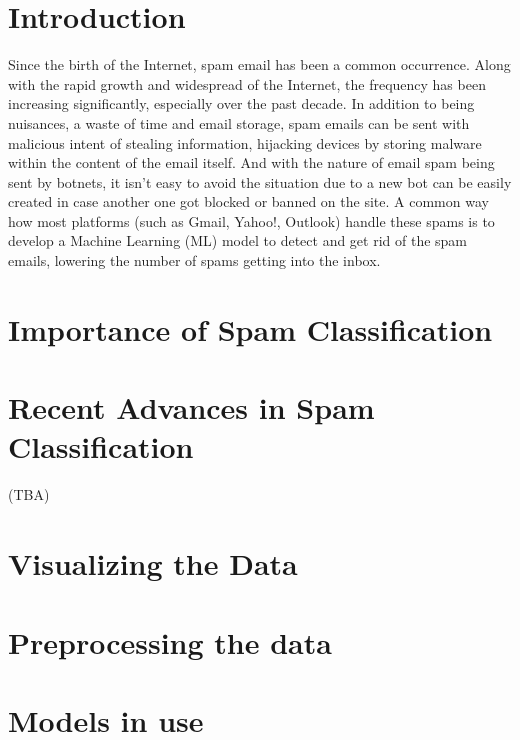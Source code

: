 \documentclass[conference]{IEEEtran}
\begin{document}
    \section{Introduction}
    \label{sec:introduction}
    Since the birth of the Internet, spam email has been a common occurrence.
    Along with the rapid growth and widespread of the Internet, the frequency has been increasing significantly, especially over the past decade.
    In addition to being nuisances, a waste of time and email storage, spam emails can be sent with malicious intent of stealing information, hijacking devices by storing malware within the content of the email itself.
    And with the nature of email spam being sent by botnets, it isn't easy to avoid the situation due to a new bot can be easily created in case another one got blocked or banned on the site.
    A common way how most platforms (such as Gmail, Yahoo!, Outlook) handle these spams is to develop a Machine Learning (ML) model to detect and get rid of the spam emails, lowering the number of spams getting into the inbox.

    \section{Importance of Spam Classification}
    \label{sec:importance-of-spam-classification}
    

    \section{Recent Advances in Spam Classification}(TBA)
    \label{sec:recent-advances-in-spam-classification}

    \section{Visualizing the Data}
    \label{sec:visualizing-the-data}
    

    \section{Preprocessing the data}
    \label{sec:preprocessing-the-data}
    

    \section{Models in use}
    \label{sec:models-in-use}
    
\end{document}
